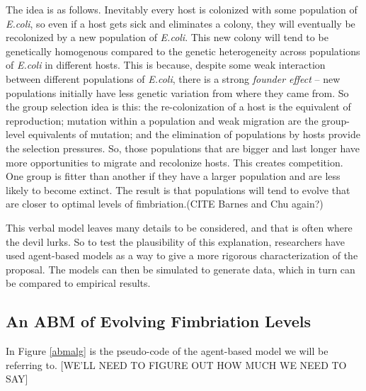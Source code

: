 \documentclass[11pt]{article}
\begin{document}
The idea is as follows. Inevitably every host is colonized with some population of \emph{E.coli}, so even if a host gets sick and eliminates a colony, they will eventually be recolonized by a new population of \emph{E.coli}.  This new colony will tend to be genetically homogenous compared to the genetic heterogeneity across populations of \emph{E.coli} in different hosts. This is because, despite some weak interaction between different populations of \emph{E.coli}, there is a strong \emph{founder effect} -- new populations initially have less genetic variation from where they came from. So the group selection idea is this: the re-colonization of a host is the equivalent of reproduction; mutation within a population and weak migration are the group-level equivalents of mutation; and the elimination of populations by hosts provide the selection pressures. So, those populations that are bigger and last longer have more opportunities to migrate and recolonize hosts. This creates competition. One group is fitter than another if they have a larger population and are less likely to become extinct. The result is that populations will tend to evolve that are closer to optimal levels of fimbriation.(CITE Barnes and Chu again?)

This verbal model leaves many details to be considered, and that is often where the devil lurks. So to test the plausibility of this explanation, researchers have used agent-based models as a way to give a more rigorous characterization of the proposal. The models can then be simulated to generate data, which in turn can be compared to empirical results.

\subsection{An ABM of Evolving Fimbriation Levels}

In Figure \ref{abmalg} is the pseudo-code of the agent-based model we will be referring to.
[WE'LL NEED TO FIGURE OUT HOW MUCH WE NEED TO SAY]
\end{document}

